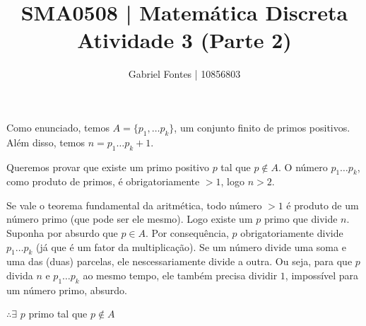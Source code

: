 \documentclass{article}
\title{SMA0508 | Matemática Discreta \\ Atividade 3 (Parte 2)}
\author{Gabriel Fontes | 10856803}
\begin{document}
\maketitle
Como enunciado, temos $A = \{p_1, \dots p_k\}$, um conjunto finito de primos positivos. Além disso, temos $n = p_1\dots p_k+1$.
\medskip

Queremos provar que existe um primo positivo $p$ tal que $p \notin A$. O número $p_1\dots p_k$, como produto de primos, é obrigatoriamente $> 1$, logo $n > 2$.
\medskip

Se vale o teorema fundamental da aritmética, todo número $>1$ é produto de um número primo (que pode ser ele mesmo). Logo existe um $p$ primo que divide $n$. Suponha por absurdo que $p \in A$. Por consequência, $p$ obrigatoriamente divide $p_1\dots p_k$ (já que é um fator da multiplicação). Se um número divide uma soma e uma das (duas) parcelas, ele nescessariamente divide a outra. Ou seja, para que $p$ divida $n$ e $p_1\dots p_k$ ao mesmo tempo, ele também precisa dividir $1$, impossível para um número primo, absurdo.
\smallskip

$\therefore \exists$ $p$ primo tal que $p \notin A$
\end{document}
